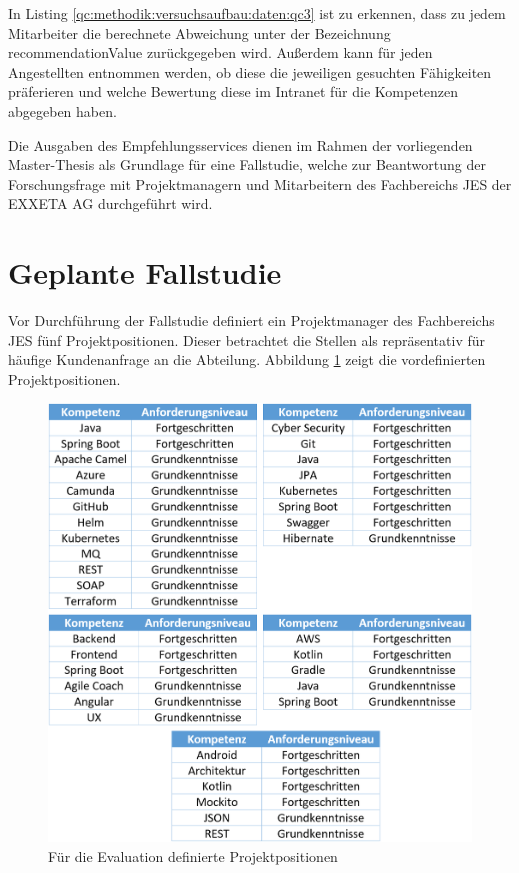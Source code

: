 In Listing \ref{qc:methodik:versuchsaufbau:daten:qc3} ist zu erkennen, dass zu jedem Mitarbeiter die berechnete Abweichung unter der Bezeichnung recommendationValue zurückgegeben wird. Außerdem kann für jeden Angestellten entnommen werden, ob diese die jeweiligen gesuchten Fähigkeiten präferieren und welche Bewertung diese im Intranet für die Kompetenzen abgegeben haben.

Die Ausgaben des Empfehlungsservices dienen im Rahmen der vorliegenden Master-Thesis als Grundlage für eine Fallstudie, welche zur Beantwortung der Forschungsfrage mit Projektmanagern und Mitarbeitern des Fachbereichs \acl{JES} der EXXETA AG durchgeführt wird.

\section{Geplante Fallstudie}
\label{ch:methodik:evaluation}
Vor Durchführung der Fallstudie definiert ein Projektmanager des Fachbereichs \acl{JES} fünf Projektpositionen. Dieser betrachtet die Stellen als repräsentativ für häufige Kundenanfrage an die Abteilung. Abbildung \ref{fig:methodik:evaluation:abb2} zeigt die vordefinierten Projektpositionen.

\begin{figure}[h]
	\centering
	\includegraphics[width=1.0\textwidth]{gfx/Projekt.png}
	\caption{Für die Evaluation definierte Projektpositionen}
	\label{fig:methodik:evaluation:abb2}
\end{figure}

